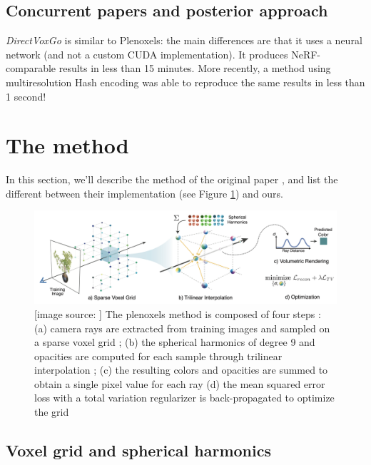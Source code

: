 \documentclass{article}
\begin{document}
\subsection{Concurrent papers and posterior approach}

\textit{DirectVoxGo} \cite{directvoxgo} is similar to Plenoxels: the main differences are that it uses a neural network (and not a custom CUDA implementation). It produces NeRF-comparable results in less than 15 minutes. More recently, a method using multiresolution Hash encoding \cite{instant} was able to reproduce the same results in less than 1 second!

\section{The method}\label{sec:method}

In this section, we'll describe the method of the original paper \cite{plenoxels}, and list the different between their implementation (see Figure \ref{fig:plenoxel}) and ours.



\begin{figure}[!h]
\centering
\includegraphics[width=1.\textwidth]{figs/plen_pipeline.png}
\caption{\label{fig:plenoxel} [image source: \cite{plenoxels}] The plenoxels method is composed of four steps : (a) camera rays are extracted from training images and sampled on a sparse voxel grid ; (b) the spherical harmonics of degree 9 and opacities are computed for each sample through trilinear interpolation ; (c) the resulting colors and opacities are summed to obtain a single pixel value for each ray (d) the mean squared error loss with a total variation regularizer is back-propagated to optimize the grid}
\end{figure}



\subsection{Voxel grid and spherical harmonics}
\end{document}
